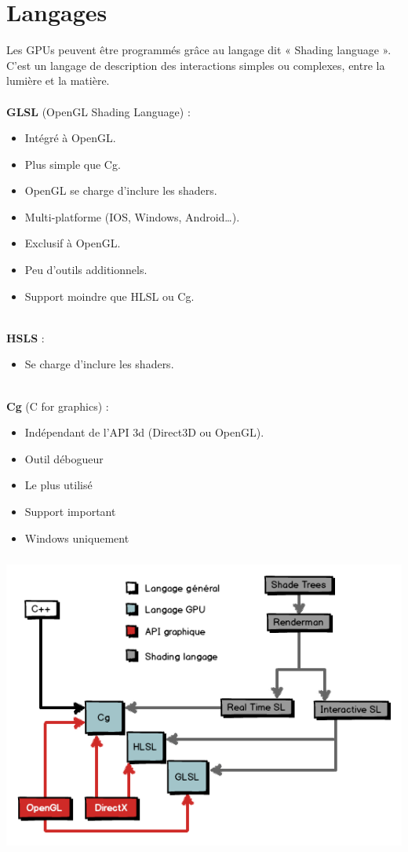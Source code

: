 \section{Langages}
Les GPUs peuvent être programmés grâce au langage dit « Shading language ». C’est un langage de description des interactions simples ou complexes, entre la lumière et la matière.\\
\textbf{\\GLSL} (OpenGL Shading Language) : 
\begin{itemize}
	\item Intégré à OpenGL.
	\item Plus simple que Cg.
	\item OpenGL se charge d’inclure les shaders.
	\item Multi-platforme (IOS, Windows, Android…).
	\item Exclusif à OpenGL.
	\item Peu d’outils additionnels.
	\item Support moindre que HLSL ou Cg.
\end{itemize}
\textbf{\\HSLS} :
\begin{itemize}
	\item Se charge d’inclure les shaders.
\end{itemize}
\textbf{\\Cg} (C for graphics) : 
\begin{itemize}
	\item Indépendant de l’API 3d (Direct3D ou OpenGL).
	\item Outil débogueur
	\item Le plus utilisé
	\item Support important
	\item Windows uniquement
\end{itemize}
\begin{center}
\includegraphics[width=14cm,height=100mm]{leo/images/langages.png}
\end{center}